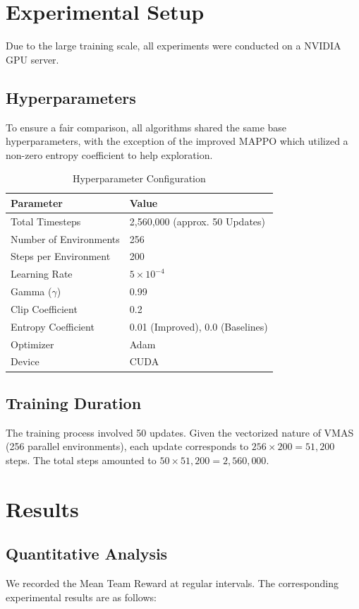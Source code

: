 \documentclass[12pt, a4paper]{article}
\begin{document}
\section{Experimental Setup}

Due to the large training scale, all experiments were conducted on a NVIDIA GPU server.

\subsection{Hyperparameters}
To ensure a fair comparison, all algorithms shared the same base hyperparameters, with the exception of the improved MAPPO which utilized a non-zero entropy coefficient to help exploration.

\begin{table}[H]
\centering
\caption{Hyperparameter Configuration}
\label{tab:params}
\begin{tabular}{ll}
\toprule
\textbf{Parameter} & \textbf{Value} \\
\midrule
Total Timesteps & 2,560,000 (approx. 50 Updates) \\
Number of Environments & 256 \\
Steps per Environment & 200 \\
Learning Rate & $5 \times 10^{-4}$ \\
Gamma ($\gamma$) & 0.99 \\
Clip Coefficient & 0.2 \\
Entropy Coefficient & 0.01 (Improved), 0.0 (Baselines) \\
Optimizer & Adam \\
Device & CUDA \\
\bottomrule
\end{tabular}
\end{table}

\subsection{Training Duration}
The training process involved 50 updates. Given the vectorized nature of VMAS (256 parallel environments), each update corresponds to $256 \times 200 = 51,200$ steps. The total steps amounted to $50 \times 51,200 = 2,560,000$.

\section{Results}

\subsection{Quantitative Analysis}
We recorded the Mean Team Reward at regular intervals. The corresponding experimental results are as follows:
\end{document}
